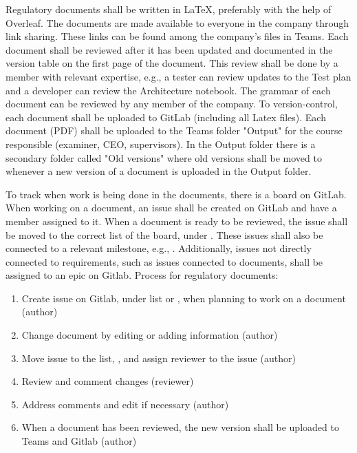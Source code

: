 Regulatory documents shall be written in LaTeX, preferably with the help of Overleaf. The documents are made available to everyone in the company through link sharing. These links can be found among the company's files in Teams. Each document shall be reviewed after it has been updated and documented in the version table on the first page of the document. This review shall be done by a member with relevant expertise, e.g., a tester can review updates to the Test plan and a developer can review the Architecture notebook. The grammar of each document can be reviewed by any member of the company. To version-control, each document shall be uploaded to GitLab (including all Latex files). Each document (PDF) shall be uploaded to the Teams folder "Output" for the course responsible (examiner, CEO, supervisors). In the Output folder there is a secondary folder called "Old versions" where old versions shall be moved to whenever a new version of a document is uploaded in the Output folder. 

To track when work is being done in the documents, there is a board on GitLab. When working on a document, an issue shall be created on GitLab and have a member assigned to it. When a document is ready to be reviewed, the issue shall be moved to the correct list of the board, under . These issues shall also be connected to a relevant milestone, e.g., . Additionally, issues not directly connected to requirements, such as issues connected to documents, shall be assigned to an epic on Gitlab. Process for regulatory documents:
\begin{enumerate}
    \item Create issue on Gitlab, under list  or , when planning to work on a document (author)
    \item Change document by editing or adding information (author)
    \item Move issue to the list, , and assign reviewer to the issue (author)
    \item Review and comment changes (reviewer)
    \item Address comments and edit if necessary (author)
    \item When a document has been reviewed, the new version shall be uploaded to Teams and Gitlab (author)
\end{enumerate}

